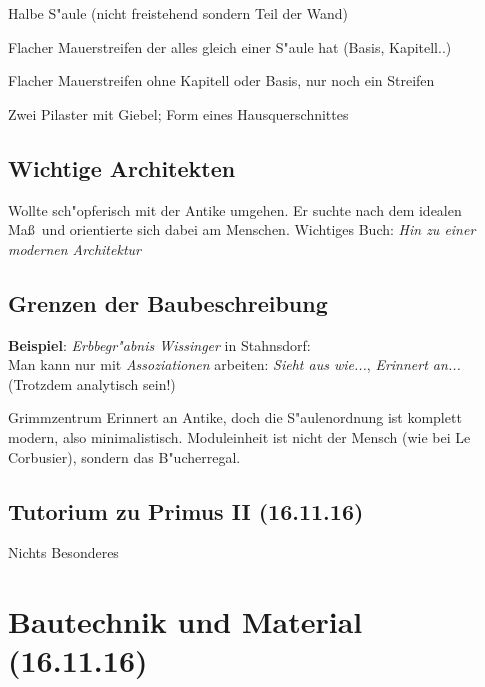 \documentclass[]{scrartcl}
\begin{document}
\begin{description}[leftmargin=!,labelwidth=\widthof{\bfseries Halbs"aulenvorlage}]
  \item[Halbs"aulenvorlage] Halbe S"aule (nicht freistehend sondern Teil der Wand)
  \item[Pilaster] Flacher Mauerstreifen der alles gleich einer S"aule hat (Basis, Kapitell..)
  \item[Lisene] Flacher Mauerstreifen ohne Kapitell oder Basis, nur noch ein Streifen
  \item["Adikula] Zwei Pilaster mit Giebel; Form eines Hausquerschnittes
\end{description}

\subsection{Wichtige Architekten}


\begin{description}[leftmargin=!,labelwidth=\widthof{\bfseries Le Corbusie}]
  \item[Le Corbusier] Wollte sch"opferisch mit der Antike umgehen. Er suchte nach dem idealen Ma\ss~und orientierte sich dabei am Menschen. Wichtiges Buch: \emph{Hin zu einer modernen Architektur}
\end{description}


\subsection{Grenzen der Baubeschreibung}

\textbf{Beispiel}: \emph{Erbbegr"abnis Wissinger} in Stahnsdorf:\\ Man kann nur mit \emph{Assoziationen} arbeiten: \emph{Sieht aus wie...}, \emph{Erinnert an...} (Trotzdem analytisch sein!)

Grimmzentrum Erinnert an Antike, doch die S"aulenordnung ist komplett modern, also minimalistisch. Moduleinheit ist nicht der Mensch (wie bei Le Corbusier), sondern das B"ucherregal.



\subsection{Tutorium zu Primus II (16.11.16)}
Nichts Besonderes

\section{Bautechnik und Material\\(16.11.16)}
\end{document}
